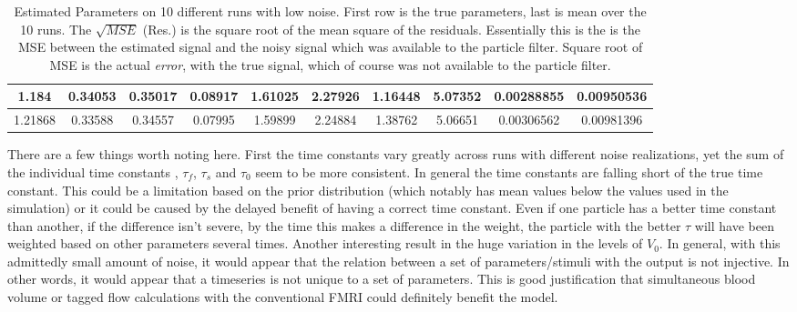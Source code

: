 \begin{table}[t]
\begin{tabular}{|c | c | c | c | c | c | c | c | c | c |}
1.184 & 0.34053 & 0.35017 & 0.08917 & 1.61025 & 2.27926 & 1.16448 & 5.07352   &  0.00288855  & 0.00950536  \\
\hline                                                                           
1.21868 & 0.33588 & 0.34557 & 0.07995 & 1.59899 & 2.24884 & 1.38762 & 5.06651 & 0.00306562     & 0.00981396 \\
\hline 
\end{tabular}
\caption{Estimated Parameters on 10 different runs with low noise. First row is the true parameters,
last is mean over the 10 runs. The $\sqrt{MSE}$ (Res.) is the square root of the mean square of the
residuals. Essentially this is the is the MSE between the estimated signal and the noisy signal which 
was available to the particle filter. Square root of MSE is the actual \emph{error}, with the true signal,
which of course was not available to the particle filter.}
\label{tab:LowNoiseResults} 
\end{table}

There are a few things worth noting here. First the time constants vary greatly across
runs with different noise realizations, yet the sum of the individual time constants
, $\tau_f$, $\tau_s$ and $\tau_0$ seem to be more consistent. In general the 
time constants are falling short of the true time constant. This could be a limitation
based on the prior distribution (which notably has mean values below the values used
in the simulation) or it could be caused by the delayed benefit of having a 
correct time constant. Even if one particle has a better time constant than another, if
the difference isn't severe, by the time this makes a difference in the weight, the 
particle with the better $\tau$ will have been weighted based on other parameters several
times. Another interesting result in the huge variation in the levels of $V_0$. In general,
with this admittedly small amount of noise, it would appear that the relation between a set
of parameters/stimuli with the output is not injective. In other words, it would appear
that a timeseries is not unique to a set of parameters. This is good justification that 
simultaneous blood volume or tagged flow calculations with the conventional FMRI 
could definitely benefit the model. 

